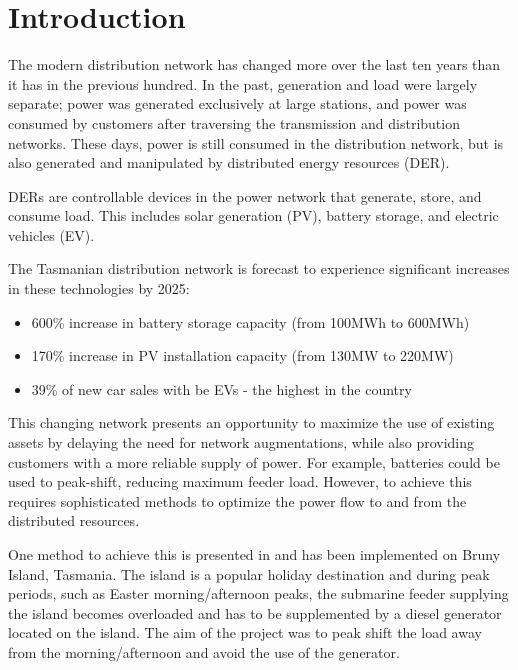 \documentclass[conference]{IEEEtran}
\begin{document}
\section{Introduction}
The modern distribution network has changed more over the last ten years than it has in the previous hundred.
In the past, generation and load were largely separate; power was generated exclusively at large stations, and power was consumed by customers after traversing the transmission and distribution networks. 
These days, power is still consumed in the distribution network, but is also generated and manipulated by distributed energy resources (DER). 
\par
DERs are controllable devices in the power network that generate, store, and consume load. 
This includes solar generation (PV), battery storage, and electric vehicles (EV). 
\par
The Tasmanian distribution network is forecast to experience significant increases in these technologies by 2025: \\
\begin{itemize}
	\item 600\% increase in battery storage capacity (from 100MWh to 600MWh) \cite{Jacobs2017}
	\item 170\% increase in PV installation capacity (from 130MW to 220MW) \cite{Jacobs2017}
	\item 39\% of new car sales with be EVs - the highest in the country \cite{AEMO2016}
\end{itemize}

This changing network presents an opportunity to maximize the use of existing assets by delaying the need for network augmentations, while also providing customers with a more reliable supply of power.
For example, batteries could be used to peak-shift, reducing maximum feeder load.
However, to achieve this requires sophisticated methods to optimize the power flow to and from the distributed resources.
\par
One method to achieve this is presented in \cite{Scott2014} and has been implemented on Bruny Island, Tasmania.
The island is a popular holiday destination and during peak periods, such as Easter morning/afternoon peaks, the submarine feeder supplying the island becomes overloaded and has to be supplemented by a diesel generator located on the island.
The aim of the project was to peak shift the load away from the morning/afternoon and avoid the use of the generator.
\end{document}
